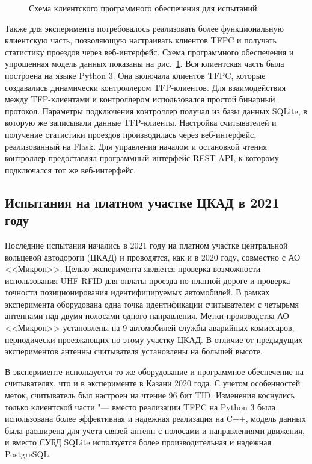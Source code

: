 \begin{figure}[ht]
  \caption{Схема клиентского программного обеспечения для испытаний}
  \label{fig:ch5_kazan2020_client}
\end{figure}

Также для эксперимента потребовалось реализовать более функциональную клиентскую часть, позволяющую настраивать клиентов TFPC и получать статистику проездов через веб-интерфейс. Схема программного обеспечения и упрощенная модель данных показаны на рис.~\ref{fig:ch5_kazan2020_client}. Вся клиентская часть была построена на языке Python 3. Она включала клиентов TFPC, которые создавались динамически контроллером TFP-клиентов. Для взаимодействия между TFP-клиентами и контроллером использовался простой бинарный протокол. Параметры подключения контроллер получал из базы данных SQLite, в которую же записывали данные TFP-клиенты. Настройка считывателей и получение статистики проездов производилась через веб-интерфейс, реализованный на Flask. Для управления началом и остановкой чтения контроллер предоставлял программный интерфейс REST API, к которому подключался тот же веб-интерфейс.


\subsection{Испытания на платном участке ЦКАД в 2021 году}\label{sec:ch5_experiments_ckad2021}

Последние испытания начались в 2021 году на платном участке центральной кольцевой автодороги (ЦКАД) и проводятся, как и в 2020 году, совместно с АО <<Микрон>>. Целью эксперимента является проверка возможности использования UHF RFID для оплаты проезда по платной дороге и проверка точности позиционирования идентифицируемых автомобилей. В рамках эксперимента оборудована одна точка идентификации считывателем с четырьмя антеннами над двумя полосами одного направления. Метки производства АО <<Микрон>> установлены на 9 автомобилей службы аварийных комиссаров, периодически проезжающих по этому участку ЦКАД. В отличие от предыдущих экспериментов антенны считывателя установлены на большей высоте.

В эксперименте используется то же оборудование и программное обеспечение на считывателях, что и в эксперименте в Казани 2020 года. С учетом особенностей меток, считыватель был настроен на чтение 96 бит TID. Изменения коснулись только клиентской части "--- вместо реализации TFPC на Python 3 была использована более эффективная и надежная реализация на C++, модель данных была расширена для учета связей антенн с полосами и направлениями движения, и вместо СУБД SQLite исползуется более производительная и надежная PostgreSQL.


